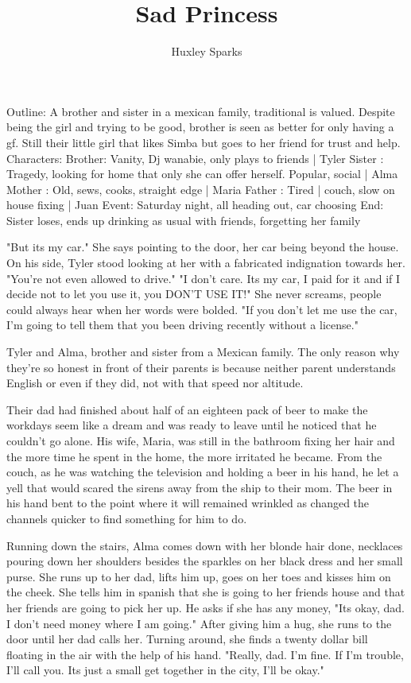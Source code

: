 \title{Sad Princess}
\author{Huxley Sparks}
\begin{Document}
    Outline: A brother and sister in a mexican family, traditional is valued. Despite being the girl and trying to be good, brother
        is seen as better for only having a gf. Still their little girl that likes Simba but goes to her friend for trust and help.
        Characters:
                Brother: Vanity, Dj wanabie, only plays to friends | Tyler
                Sister : Tragedy, looking for home that only she can offer herself. Popular, social | Alma
                Mother : Old, sews, cooks, straight edge | Maria
                Father : Tired | couch, slow on house fixing | Juan
        Event:
                Saturday night, all heading out, car choosing
        End:
                Sister loses, ends up drinking as usual with friends, forgetting her family

        "But its my car." She says pointing to the door, her car being beyond the house. On his side, Tyler stood looking at her with a
    fabricated indignation towards her. "You're not even allowed to drive." "I don't care. Its my car, I paid for it and if I decide not
    to let you use it, you DON'T USE IT!" She never screams, people could always hear when her words were bolded. "If you don't let me
    use the car, I'm going to tell them that you been driving recently without a license."

        Tyler and Alma, brother and sister from a Mexican family. The only reason why they're so honest in front of their parents is because
    neither parent understands English or even if they did, not with that speed nor altitude. 

        Their dad had finished about half of an eighteen pack of beer to make the workdays seem like a dream and was ready to leave until he
    noticed that he couldn't go alone. His wife, Maria, was still in the bathroom fixing her hair and the more time he spent in the home, the
    more irritated he became. From the couch, as he was watching the television and holding a beer in his hand, he let a yell that would 
    scared the sirens away from the ship to their mom. The beer in his hand bent to the point where it will remained wrinkled as changed the
    channels quicker to find something for him to do.

        Running down the stairs, Alma comes down with her blonde hair done, necklaces pouring down her shoulders besides the sparkles on her black
    dress and her small purse. She runs up to her dad, lifts him up, goes on her toes and kisses him on the cheek. She tells him in spanish that
    she is going to her friends house and that her friends are going to pick her up. He asks if she has any money, "Its okay, dad. I don't need
    money where I am going." After giving him a hug, she runs to the door until her dad calls her. Turning around, she finds a twenty dollar bill
    floating in the air with the help of his hand. "Really, dad. I'm fine. If I'm trouble, I'll call you. Its just a small get together in the city,
    I'll be okay."


\end{Document}

